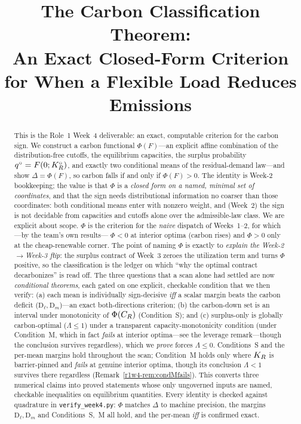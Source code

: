 \title[The Carbon Classification Theorem (Week 4)]
{The Carbon Classification Theorem:\\
An Exact Closed-Form Criterion for When a Flexible Load Reduces Emissions}



\begin{abstract}
This is the Role~1 Week~4 deliverable: an exact, computable criterion for the carbon
sign. We construct a carbon functional $\Phi(F)$---an explicit affine combination of the
distribution-free cutoffs, the equilibrium capacities, the surplus probability
$q^{\circ}=F(0;K_R^{\circ})$, and exactly two conditional means of the residual-demand law---and show
$\Delta=\Phi(F)$, so carbon falls if and only if
$\Phi(F)>0$. The identity is Week-2 bookkeeping; the value is that $\Phi$ is a
\emph{closed form on a named, minimal set of coordinates}, and that the sign needs
distributional information no coarser than those coordinates: both conditional means enter
with nonzero weight, and (Week~2) the sign is not decidable from capacities and cutoffs
alone over the admissible-law class. We are explicit about scope. $\Phi$ is the criterion
for the \emph{naive} dispatch of Weeks~1--2, for which---by the team's own results---%
$\Phi<0$ at interior optima (carbon rises) and $\Phi>0$ only at the cheap-renewable
corner. The point of naming $\Phi$ is exactly to \emph{explain the Week-2$\to$Week-3
flip}: the surplus contract of Week~3 zeroes the utilization term and turns $\Phi$
positive, so the classification is the ledger on which ``why the optimal contract
decarbonizes'' is read off. The three questions that a scan alone had settled are now \emph{conditional theorems}, each
gated on one explicit, checkable condition that we then verify: (a) each mean is
individually sign-decisive \emph{iff} a scalar margin beats the carbon deficit
($\mathrm{D}_\ell,\mathrm{D}_m$)---an exact both-directions criterion; (b) the carbon-down
set is an interval under monotonicity of $\Phi(C_R)$ (Condition~S); and (c) surplus-only is
globally carbon-optimal ($\Lambda\le1$) under a transparent capacity-monotonicity condition
(under Condition~M, which in fact \emph{fails} at interior optima---see the leverage
remark---though the conclusion survives regardless), which we \emph{prove}
forces $\Lambda\le0$. Conditions~S and the per-mean margins hold throughout the scan;
Condition~M holds only where $K_R$ is barrier-pinned and \emph{fails} at genuine interior
optima, though its conclusion $\Lambda<1$ survives there regardless (Remark~\ref{r1w4-rem:condMfails}).
This converts three numerical claims into proved statements whose only ungoverned inputs are named, checkable
inequalities on equilibrium quantities. Every identity is checked against quadrature in
\texttt{verify\_week4.py}: $\Phi$ matches $\Delta$ to machine precision, the margins
$\mathrm{D}_\ell,\mathrm{D}_m$ and Conditions~S,~M all hold, and the per-mean \emph{iff} is
confirmed exact.
\end{abstract}



